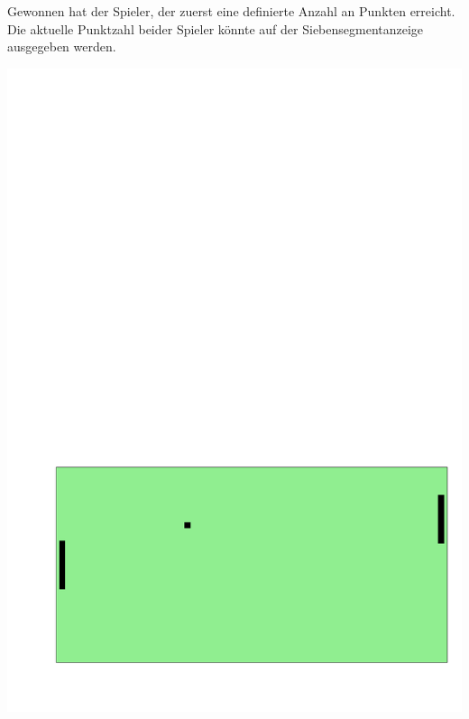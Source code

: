 Gewonnen hat der Spieler, der zuerst eine definierte Anzahl an Punkten erreicht.
Die aktuelle Punktzahl beider Spieler könnte auf der Siebensegmentanzeige ausgegeben werden.
\begin{center}
\includegraphics[scale=0.4]{05_c/figures/pong}
\end{center}



